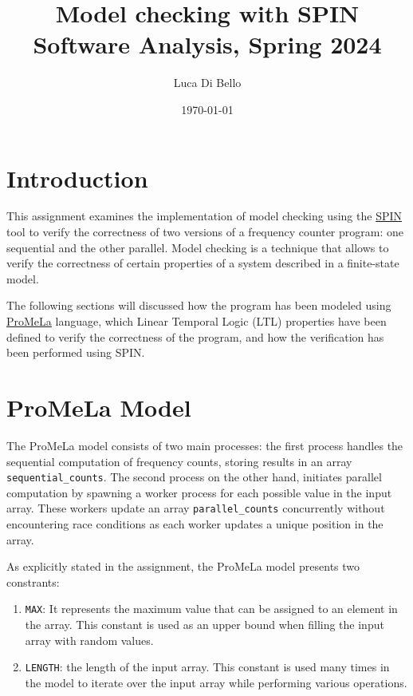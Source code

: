 \documentclass[a4paper, 11pt]{article}
\title{Model checking with SPIN \\[1ex] \large Software Analysis, Spring 2024}
\author{Luca Di Bello}
\date{\today}
\begin{document}
\maketitle
\tableofcontents

\section{Introduction}

This assignment examines the implementation of model checking using the \href{https://spinroot.com/spin/whatispin.html}{SPIN} tool to verify the correctness of two versions of a frequency counter program: one sequential and the other parallel. Model checking is a technique that allows to verify the correctness of certain properties of a system described in a finite-state model.

\vspace{1em}

\noindent The following sections will discussed how the program has been modeled using \href{https://en.wikipedia.org/wiki/Promela}{ProMeLa} language, which Linear Temporal Logic (LTL) properties have been defined to verify the correctness of the program, and how the verification has been performed using SPIN.

\pagebreak

\section{ProMeLa Model}

The ProMeLa model consists of two main processes: the first process handles the sequential computation of frequency counts, storing results in an array \texttt{sequential\_counts}. The second process on the other hand, initiates parallel computation by spawning a worker process for each possible value in the input array. These workers update an array \texttt{parallel\_counts} concurrently without encountering race conditions as each worker updates a unique position in the array.

As explicitly stated in the assignment, the ProMeLa model presents two constrants:

\begin{enumerate}
	\item \texttt{MAX}: It represents the maximum value that can be assigned to an element in the array. This constant is used as an upper bound when filling the input array with random values.
	\item \texttt{LENGTH}: the length of the input array. This constant is used many times in the model to iterate over the input array while performing various operations.
\end{enumerate}
\end{document}
